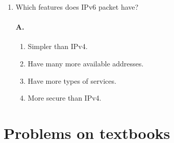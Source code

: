 \documentclass[]{article}
\begin{document}
\begin{enumerate}
	
	\item Which features does IPv6 packet have?
	\paragraph{A.}
	\begin{enumerate}
		\item Simpler than IPv4.
		\item Have many more available addresses.
		\item Have more types of services.
		\item More secure than IPv4.
	\end{enumerate}
\end{enumerate}

\section{Problems on textbooks}
\end{document}
